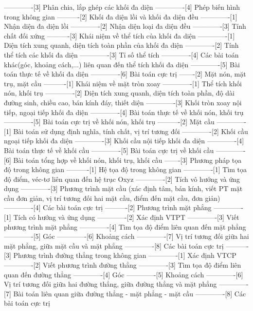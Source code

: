 -------------[3] Phân chia, lắp ghép các khối đa diện
-------------[4] Phép biến hình trong không gian
----------[2] Khối đa diện lồi và khối đa diện đều
-------------[1] Nhận diện đa diện lồi
-------------[2] Nhận diện loại đa diện đều
-------------[3] Tính chất đối xứng
----------[3] Khái niệm về thể tích của khối đa diện
-------------[1] Diện tích xung quanh, diện tích toàn phần của khối đa diện
-------------[2] Tính thể tích các khối đa diện
-------------[3] Tỉ số thể tích
-------------[4] Các bài toán khác(góc, khoảng cách,...) liên quan đến thể tích khối đa diện
-------------[5] Bài toán thực tế về khối đa diện
-------------[6] Bài toán cực trị
-------[2] Mặt nón, mặt trụ, mặt cầu
----------[1] Khái niệm về mặt tròn xoay
-------------[1] Thể tích khối nón, khối trụ
-------------[2] Diện tích xung quanh, diện tích toàn phần, độ dài đường sinh, chiều cao, bán kính đáy, thiết diện
-------------[3] Khối tròn xoay nội tiếp, ngoại tiếp khối đa diện
-------------[4] Bài toán thực tế về khối nón, khối trụ
-------------[5] Bài toán cực trị về khối nón, khối trụ
----------[2] Mặt cầu
-------------[1] Bài toán sử dụng định nghĩa, tính chất, vị trí tương đối
-------------[2] Khối cầu ngoại tiếp khối đa diện
-------------[3] Khối cầu nội tiếp khối đa diện
-------------[4] Bài toán thực tế về khối cầu
-------------[5] Bài toán cực trị về khối cầu
-------------[6] Bài toán tổng hợp về khối nón, khối trụ, khối cầu
-------[3] Phương pháp tọa độ trong không gian
----------[1] Hệ tọa độ trong không gian
-------------[1] Tìm tọa độ điểm, véc-tơ liên quan đến hệ trục Oxyz
-------------[2] Tích vô hướng và ứng dụng
-------------[3] Phương trình mặt cầu (xác định tâm, bán kính, viết PT mặt cầu đơn giản, vị trí tương đối hai mặt cầu, điểm đến mặt cầu, đơn giản)
-------------[4] Các bài toán cực trị
----------[2] Phương trình mặt phẳng
-------------[1] Tích có hướng và ứng dụng
-------------[2] Xác định VTPT
-------------[3] Viết phương trình mặt phẳng
-------------[4] Tìm tọa độ điểm liên quan đến mặt phẳng
-------------[5] Góc
-------------[6] Khoảng cách
-------------[7] Vị trí tương đối giữa hai mặt phẳng, giữa mặt cầu và mặt phẳng
-------------[8] Các bài toán cực trị
----------[3] Phương trình đường thẳng trong không gian
-------------[1] Xác định VTCP
-------------[2] Viết phương trình đường thẳng
-------------[3] Tìm tọa độ điểm liên quan đến đường thẳng
-------------[4] Góc
-------------[5] Khoảng cách
-------------[6] Vị trí tương đối giữa hai đường thẳng, giữa đường thẳng và mặt phẳng
-------------[7] Bài toán liên quan giữa đường thẳng - mặt phẳng - mặt cầu
-------------[8] Các bài toán cực trị
